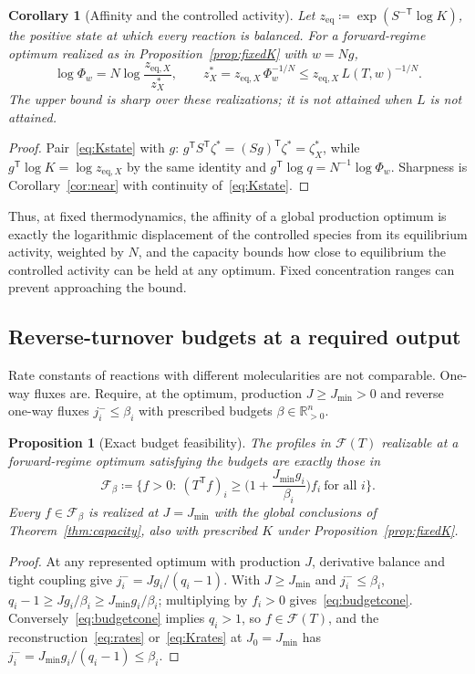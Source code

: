 \documentclass[11pt,a4paper]{article}
\theoremstyle{plain}
\newtheorem{proposition}[theorem]{Proposition}
\newtheorem{corollary}[theorem]{Corollary}
\theoremstyle{definition}
\theoremstyle{remark}
\numberwithin{equation}{section}
\newcommand{\R}{\mathbb{R}}
\newcommand{\T}{\mathsf{T}}
\newcommand{\cone}{\mathcal{F}}
\newcommand{\Jmin}{J_{\min}}
\begin{document}
\begin{corollary}[Affinity and the controlled activity]\label{cor:concentration}
Let $z_{\mathrm{eq}}\coloneqq\exp(S^{-\T}\log K)$, the positive state at which every reaction is balanced. For a forward-regime optimum realized as in Proposition~\ref{prop:fixedK} with $w=Ng$,
\begin{equation}\label{eq:concentration}
 \log\Phi_w=N\log\frac{z_{\mathrm{eq},X}}{z^*_X},\qquad
 z^*_X=z_{\mathrm{eq},X}\,\Phi_w^{-1/N}\le z_{\mathrm{eq},X}\,L(T,w)^{-1/N}.
\end{equation}
The upper bound is sharp over these realizations; it is not attained when $L$ is not attained.
\end{corollary}
\begin{proof}
Pair~\eqref{eq:Kstate} with $g$: $g^{\T}S^{\T}\zeta^*=(Sg)^{\T}\zeta^*=\zeta^*_X$, while $g^{\T}\log K=\log z_{\mathrm{eq},X}$ by the same identity and $g^{\T}\log q=N^{-1}\log\Phi_w$. Sharpness is Corollary~\ref{cor:near} with continuity of~\eqref{eq:Kstate}.
\end{proof}

Thus, at fixed thermodynamics, the affinity of a global production optimum is exactly the logarithmic displacement of the controlled species from its equilibrium activity, weighted by $N$, and the capacity bounds how close to equilibrium the controlled activity can be held at any optimum. Fixed concentration ranges can prevent approaching the bound.

\subsection{Reverse-turnover budgets at a required output}
Rate constants of reactions with different molecularities are not comparable. One-way fluxes are. Require, at the optimum, production $J\ge\Jmin>0$ and reverse one-way fluxes $j^-_i\le\beta_i$ with prescribed budgets $\beta\in\R^n_{>0}$.

\begin{proposition}[Exact budget feasibility]\label{prop:budget}
The profiles in $\cone(T)$ realizable at a forward-regime optimum satisfying the budgets are exactly those in
\begin{equation}\label{eq:budgetcone}
 \cone_\beta\coloneqq\Big\{f>0:\ (T^{\T}f)_i\ge\Big(1+\frac{\Jmin g_i}{\beta_i}\Big)f_i\ \text{for all }i\Big\}.
\end{equation}
Every $f\in\cone_\beta$ is realized at $J=\Jmin$ with the global conclusions of Theorem~\ref{thm:capacity}, also with prescribed $K$ under Proposition~\ref{prop:fixedK}.
\end{proposition}
\begin{proof}
At any represented optimum with production $J$, derivative balance and tight coupling give $j^-_i=Jg_i/(q_i-1)$. With $J\ge\Jmin$ and $j^-_i\le\beta_i$, $q_i-1\ge Jg_i/\beta_i\ge\Jmin g_i/\beta_i$; multiplying by $f_i>0$ gives~\eqref{eq:budgetcone}. Conversely~\eqref{eq:budgetcone} implies $q_i>1$, so $f\in\cone(T)$, and the reconstruction~\eqref{eq:rates} or~\eqref{eq:Krates} at $J_0=\Jmin$ has $j^-_i=\Jmin g_i/(q_i-1)\le\beta_i$.
\end{proof}
\end{document}
